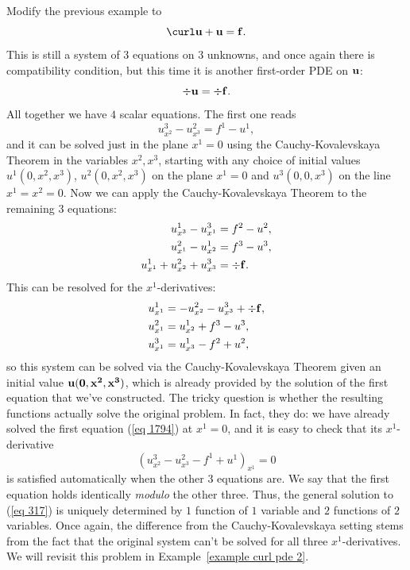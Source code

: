 \begin{example}\label{example curl pde}
    Modify the previous example to 
    \[\curl \bf{u}+\bf{u}=\bf{f}.\label{eq 317}\]
    This is still a system of $3$ equations on $3$ unknowns, and once again there is compatibility condition, but this time it is another first-order PDE on $\bf{u}$:
    \[\div\bf{u}=\div\bf{f}.\]
    All together we have $4$ scalar equations. The first one reads 
    \[u^3_{x^2}-u^2_{x^3}=f^1-u^1,\label{eq 1794}\] 
    and it can be solved just in the plane $x^1=0$ using the Cauchy-Kovalevskaya Theorem in the variables $x^2,x^3$, starting with any choice of initial values $u^1(0,x^2,x^3)$, $u^2(0,x^2,x^3)$ on the plane $x^1=0$ and $u^3(0,0,x^3)$ on the line $x^1=x^2=0$. Now we can apply the Cauchy-Kovalevskaya Theorem to the remaining $3$ equations:
    \begin{align}
        u^1_{x^3}-u^3_{x^1}&=f^2-u^2,\\
        u^2_{x^1}-u^1_{x^2}&=f^3-u^3,\\
        u^1_{x^1}+u^2_{x^2}+u^3_{x^3}&=\div\bf{f}.
    \end{align}
    This can be resolved for the $x^1$-derivatives:
    \begin{align}
        u^1_{x^1}&=-u^2_{x^2}-u^3_{x^3}+\div\bf{f},\\
        u^2_{x^1}&=u^1_{x^2}+f^3-u^3,\\
        u^3_{x^1}&=u^1_{x^3}-f^2+u^2,
    \end{align}
    so this system can be solved via the Cauchy-Kovalevskaya Theorem given an initial value $\bf{u}(0,x^2,x^3)$, which is already provided by the solution of the first equation that we've constructed. The tricky question is whether the resulting functions actually solve the original problem. In fact, they do: we have already solved the first equation (\ref{eq 1794}) at $x^1=0$, and it is easy to check that its $x^1$-derivative
    \[(u^3_{x^2}-u^2_{x^3}-f^1+u^1)_{x^1}=0\]
    is satisfied automatically when the other $3$ equations are. We say that the first equation holds identically \emph{modulo} the other three. Thus, the general solution to (\ref{eq 317}) is uniquely determined by $1$ function of $1$ variable and $2$ functions of $2$ variables. Once again, the difference from the Cauchy-Kovalevskaya setting stems from the fact that the original system can't be solved for all three $x^1$-derivatives. We will revisit this problem in Example~\ref{example curl pde 2}.
\end{example}

